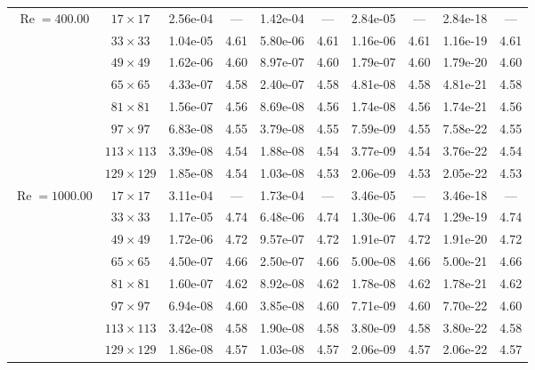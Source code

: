 \documentclass[preprint, 12pt]{elsarticle}
\begin{document}
\begin{center}
\begin{table}[H]
{\begin{tabular*}{\textwidth}{@{\extracolsep\fill}cccccccccc@{}}
    \hline
    \multirow{7}{*}{$\operatorname{Re}=400.00$} & $17\times 17$ & 2.56e-04 & --- & 1.42e-04 & --- & 2.84e-05 & --- & 2.84e-18 & --- \\
    & $33\times 33$ & 1.04e-05 & 4.61 & 5.80e-06 & 4.61 & 1.16e-06 & 4.61 & 1.16e-19 & 4.61 \\
    & $49\times 49$ & 1.62e-06 & 4.60 & 8.97e-07 & 4.60 & 1.79e-07 & 4.60 & 1.79e-20 & 4.60 \\
    \multirow{3}{*}{$\operatorname{Wi}=10$} & $65\times 65$ & 4.33e-07 & 4.58 & 2.40e-07 & 4.58 & 4.81e-08 & 4.58 & 4.81e-21 & 4.58 \\
    & $81\times 81$ & 1.56e-07 & 4.56 & 8.69e-08 & 4.56 & 1.74e-08 & 4.56 & 1.74e-21 & 4.56 \\
    & $97\times 97$ & 6.83e-08 & 4.55 & 3.79e-08 & 4.55 & 7.59e-09 & 4.55 & 7.58e-22 & 4.55 \\
    & $113\times 113$ & 3.39e-08 & 4.54 & 1.88e-08 & 4.54 & 3.77e-09 & 4.54 & 3.76e-22 & 4.54 \\
    & $129\times 129$ & 1.85e-08 & 4.54 & 1.03e-08 & 4.53 & 2.06e-09 & 4.53 & 2.05e-22 & 4.53 \\
    \hline
    \multirow{7}{*}{$\operatorname{Re}=1000.00$} & $17\times 17$ & 3.11e-04 & --- & 1.73e-04 & --- & 3.46e-05 & --- & 3.46e-18 & --- \\
    & $33\times 33$ & 1.17e-05 & 4.74 & 6.48e-06 & 4.74 & 1.30e-06 & 4.74 & 1.29e-19 & 4.74 \\
    & $49\times 49$ & 1.72e-06 & 4.72 & 9.57e-07 & 4.72 & 1.91e-07 & 4.72 & 1.91e-20 & 4.72 \\
    \multirow{3}{*}{$\operatorname{Wi}=10$} & $65\times 65$ & 4.50e-07 & 4.66 & 2.50e-07 & 4.66 & 5.00e-08 & 4.66 & 5.00e-21 & 4.66 \\
    & $81\times 81$ & 1.60e-07 & 4.62 & 8.92e-08 & 4.62 & 1.78e-08 & 4.62 & 1.78e-21 & 4.62 \\
    & $97\times 97$ & 6.94e-08 & 4.60 & 3.85e-08 & 4.60 & 7.71e-09 & 4.60 & 7.70e-22 & 4.60 \\
    & $113\times 113$ & 3.42e-08 & 4.58 & 1.90e-08 & 4.58 & 3.80e-09 & 4.58 & 3.80e-22 & 4.58 \\
    & $129\times 129$ & 1.86e-08 & 4.57 & 1.03e-08 & 4.57 & 2.06e-09 & 4.57 & 2.06e-22 & 4.57 \\
    \hline
    \end{tabular*}
}
\end{table}
\end{center}
\end{document}
